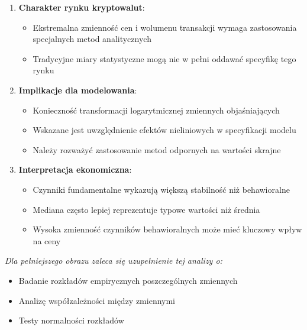 \documentclass[
  11pt,
]{article}
\providecommand{\tightlist}{%
  \setlength{\itemsep}{0pt}\setlength{\parskip}{0pt}}
\begin{document}
\begin{enumerate}
\def\labelenumi{\arabic{enumi}.}
\tightlist
\item
  \textbf{Charakter rynku kryptowalut}:

  \begin{itemize}
  \tightlist
  \item
    Ekstremalna zmienność cen i wolumenu transakcji wymaga zastosowania
    specjalnych metod analitycznych
  \item
    Tradycyjne miary statystyczne mogą nie w pełni oddawać specyfikę
    tego rynku
  \end{itemize}
\item
  \textbf{Implikacje dla modelowania}: \vspace{0.2cm}

  \begin{itemize}
  \tightlist
  \item
    Konieczność transformacji logarytmicznej zmiennych objaśniających
  \item
    Wskazane jest uwzględnienie efektów nieliniowych w specyfikacji
    modelu
  \item
    Należy rozważyć zastosowanie metod odpornych na wartości skrajne
  \end{itemize}
\item
  \textbf{Interpretacja ekonomiczna}: \vspace{0.2cm}

  \begin{itemize}
  \tightlist
  \item
    Czynniki fundamentalne wykazują większą stabilność niż behawioralne
  \item
    Mediana często lepiej reprezentuje typowe wartości niż średnia
  \item
    Wysoka zmienność czynników behawioralnych może mieć kluczowy wpływ
    na ceny
  \end{itemize}
\end{enumerate}

\vspace{0.3cm}

\textit{Dla pełniejszego obrazu zaleca się uzupełnienie tej analizy o:}

\begin{itemize}
\item Badanie rozkładów empirycznych poszczególnych zmiennych
\item Analizę współzależności między zmiennymi
\item Testy normalności rozkładów
\end{itemize}
\end{document}
